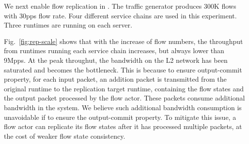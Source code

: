 


We next enable flow replication in \nfactor. The traffic generator produces 300K flows with 30pps flow rate. %
Four different service chains are used in this experiment. %
Three runtimes are running on each server.

Fig.~\ref{fig:rep-scale} shows that with the increase of flow numbers, the throughput from runtimes running each service chain increases, but always lower than %
 9Mpps. %
At the peak throughut, the bandwidth on the L2 network has been saturated and becomes the bottleneck. This is because to ensure output-commit property, for each input packet, an addition packet is transmitted from the original runtime to the replication target runtime, %
 containing the flow states and the output packet processed by the flow actor. These packets consume additional bandwidth in the system. %
 We believe such additional bandwidth consumption is unavoidable if to ensure the %
 output-commit property. To mitigate this issue, a flow actor can replicate its flow states after it has processed multiple packets, at the cost of weaker flow state consistency. %

